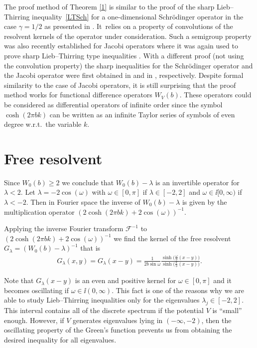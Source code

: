 The proof method of Theorem \ref{1} is similar to the proof of the sharp Lieb--Thirring inequa\-lity~\eqref{LTSch} for a one-dimensional Schr\"odinger operator in the case $\gamma=1/2$ as presented in \cite{HLW}. It~relies on a property of convolutions of the resolvent kernels of the operator under consideration. Such a semigroup property was also recently established for Jacobi operators where it was again used to prove sharp Lieb--Thirring type inequalities \cite{LLS}. With a different proof (not using the convolution property) the sharp inequalities for the Schr\"odinger operator and the Jacobi operator were first obtained in \cite{HLT} and in \cite{HS}, respectively. Despite formal similarity to the case of Jacobi operators, it is still surprising that the proof method works for functional difference operators $W_V(b)$. These operators could be considered as differential operators of infinite order since the symbol $\cosh(2\pi b k)$ can be written as an infinite Taylor series of symbols of even degree w.r.t.\ the variable $k$.

\section{Free resolvent}

Since $W_0(b)\ge 2$ we conclude that $W_0(b)-\lambda$ is an invertible operator for $\lambda<2$. Let
$\lambda=-2\cos(\omega)$ with $\omega\in[0,\pi]$ if $\lambda\in[-2,2]$ and $\omega\in\ii[0,\infty)$ if $\lambda<-2$. Then in Fourier space the inverse of $W_0(b)-\lambda$ is given by the multiplication operator $(2\cosh(2\pi b k)+2\cos(\omega))^{-1}$.

Applying the inverse Fourier transform $\mathcal{F}^{-1}$ to $(2\cosh(2\pi b k)+2\cos(\omega))^{-1}$ we find the kernel of the free resolvent $G_\lambda=(W_0(b)-\lambda)^{-1}$ that is
\begin{gather}\label{rezolvent}
G_\lambda(x,y) = G_\lambda(x-y)=\frac{1}{2b\sin \omega} \frac{\sinh \big(\frac{\omega}{b} (x-y)\big)}{\sinh \big(\frac{\pi}{b} (x-y)\big)}.
\end{gather}

\begin{Remark}
Note that $G_\lambda(x-y)$ is an even and positive kernel for $\omega\in[0,\pi]$ and it becomes oscillating if
$\omega\in \ii(0,\infty)$.
This fact is one of the reasons why we are able to study Lieb--Thirring inequalities only for the eigenvalues $\lambda_j \in [-2,2]$. This interval contains all of the discrete spectrum if the potential $V$ is ``small'' enough. However, if $V$ generates eigenvalues lying in $(-\infty,-2)$, then the oscillating property of the Green's function prevents us from obtaining the desired inequality for all eigenvalues.
\end{Remark}

